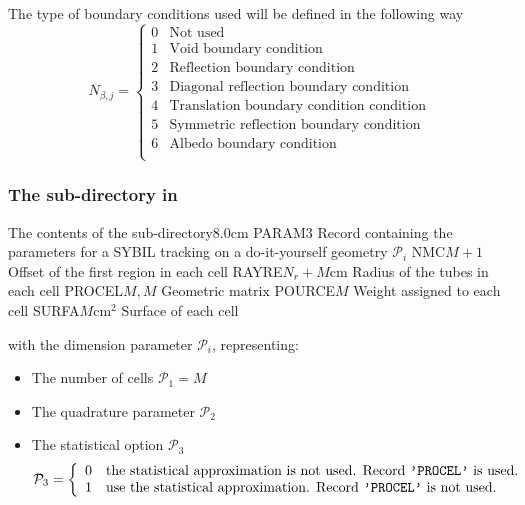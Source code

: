 The type of boundary conditions used will be defined in the following way
\begin{displaymath}
N_{\beta,j} = \left\{
\begin{array}{rl}
 0 & \textrm{Not used} \\
 1 & \textrm{Void boundary condition} \\
 2 & \textrm{Reflection boundary condition} \\
 3 & \textrm{Diagonal reflection boundary condition} \\
 4 & \textrm{Translation boundary condition condition} \\
 5 & \textrm{Symmetric reflection boundary condition} \\
 6 & \textrm{Albedo boundary condition} \\
\end{array} \right.
\end{displaymath}

\subsubsection{The  sub-directory in }\label{sect:doittrackingdir}

\vskip -0.9cm

\begin{DescriptionEnregistrement}{The contents of the 
 sub-directory}{8.0cm}
\IntEnr
  {PARAM}{$3$}
  {Record containing the parameters for a SYBIL tracking on a do-it-yourself geometry
   $\mathcal{P}_{i}$} 
\IntEnr
  {NMC}{$M+1$}
  {Offset of the first region in each cell}
\RealEnr
  {RAYRE}{$N_r+M$}{cm}
  {Radius of the tubes in each cell}
\RealEnr
  {PROCEL}{$M,M$}{}
  {Geometric matrix}
\RealEnr
  {POURCE}{$M$}{}
  {Weight assigned to each cell}
\RealEnr
  {SURFA}{$M$}{cm$^{2}$}
  {Surface of each cell }
\end{DescriptionEnregistrement}
\noindent
with the dimension parameter $\mathcal{P}_{i}$, representing:

\begin{itemize}
\item The number of cells $\mathcal{P}_{1}=M$

\item The quadrature parameter $\mathcal{P}_{2}$

\item The statistical option $\mathcal{P}_{3}$
\begin{displaymath}
\mathcal{P}_{3} = \left\{
\begin{array}{rl}
 0 & \textrm{the statistical approximation is not used. Record {\tt 'PROCEL'} is used.} \\
 1 & \textrm{use the statistical approximation. Record {\tt 'PROCEL'} is not used.}
\end{array} \right.
\end{displaymath}

\end{itemize}

